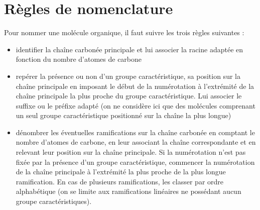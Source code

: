 \documentclass[a4paper,11pt,fleqn]{article}%
\begin{document}
\section{Règles de nomenclature}
Pour nommer une molécule organique, il faut suivre les trois règles suivantes :
\begin{itemize}
	\item identifier la chaîne carbonée principale et lui associer la  racine adaptée en fonction du nombre d'atomes de carbone
	\item repérer la présence ou non d'un groupe caractéristique, sa position sur la chaîne principale en imposant le début de la numérotation à l'extrémité de la chaîne principale la plus proche du groupe caractéristique. Lui associer le suffixe ou le préfixe adapté (on ne considère ici que des molécules comprenant un seul groupe caractéristique positionné sur la chaîne la plus longue)
	\item dénombrer  les éventuelles ramifications sur la chaîne carbonée en comptant le nombre d'atomes de carbone, en leur associant la chaîne correspondante et en relevant leur position sur la chaîne principale. Si la numérotation n'est pas fixée par la présence d'un groupe caractéristique, commencer la numérotation de la chaîne principale à l'extrémité la plus proche de la plus longue ramification. En cas de plusieurs ramifications, les classer par ordre alphabétique (on se limite aux ramifications linéaires ne possédant aucun groupe caractéristiques).
\end{itemize}
\end{document}
